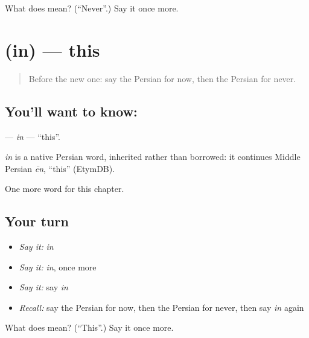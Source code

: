 \begin{tcolorbox}[breakable,colback=teal!4,colframe=teal!35!black,title={Before you move on}]
What does  mean? (\textquotedblleft{}Never\textquotedblright{}.) Say it once more.
\end{tcolorbox}
\section[\texorpdfstring{\fa{این} (in)}{این (in)}]{ (in) — this}

\label{lesson:FA-C82-in}



\begin{quote}
Before the new one: say the Persian for now, then the Persian for never.
\end{quote}

\subsection*{You'll want to know: }
\textbf{} — \emph{in} — \textquotedblleft{}this\textquotedblright{}.

\begin{cousinweb}
\emph{in} is a native Persian word, inherited rather than borrowed: it continues Middle Persian \emph{ēn}, \textquotedblleft{}this\textquotedblright{} (EtymDB).
\end{cousinweb}

\begin{grammarlens}[title={What you've built}]
One more word for this chapter.
\end{grammarlens}

\subsection*{Your turn}
\begin{itemize}
\raggedright
  \item \emph{Say it:} \emph{in}
  \item \emph{Say it:} \emph{in}, once more
  \item \emph{Say it:} say \emph{in}
  \item \emph{Recall:} say the Persian for now, then the Persian for never, then say \emph{in} again
\end{itemize}

\begin{tcolorbox}[breakable,colback=teal!4,colframe=teal!35!black,title={Before you move on}]
What does  mean? (\textquotedblleft{}This\textquotedblright{}.) Say it once more.
\end{tcolorbox}
